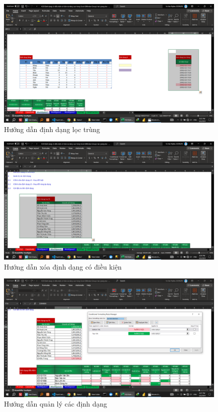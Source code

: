 \documentclass{article}
\begin{document}
\begin{figure}[H]
\centering
\includegraphics[scale = 0.15]{Video7/HuongDan/5.png}
\caption{Hướng dẫn  định dạng lọc trùng  }
\end{figure}


\begin{figure}[H]
\centering
\includegraphics[scale = 0.15]{Video7/HuongDan/6.png}
\caption{Hướng dẫn   xóa định dạng có điều kiện  }
\end{figure}


\begin{figure}[H]
\centering
\includegraphics[scale = 0.15]{Video7/HuongDan/7.png}
\caption{Hướng dẫn  quản lý các định dạng  }
\end{figure}
\end{document}
